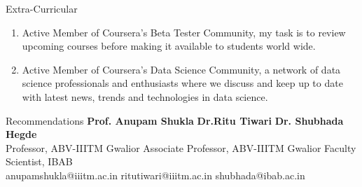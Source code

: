 \documentclass{resume} %
\begin{document}
\begin{rSection}{Extra-Curricular} \itemsep -3pt
\begin{enumerate}
\item Active Member of Coursera's Beta Tester Community, my task is to review upcoming courses before making it available to students world wide.
\item Active Member of Coursera's Data Science Community, a network of data science professionals and enthusiasts where we discuss and keep up to date with latest news, trends and technologies in data science.  
\end{enumerate}
\end{rSection}
\newpage
\begin{rSection}{Recommendations}
\textbf{Prof. Anupam Shukla} \hspace{1.3cm} \textbf{Dr.Ritu Tiwari} \hspace{4cm} \textbf{Dr. Shubhada Hegde}\\
Professor, ABV-IIITM Gwalior \hspace{0.3cm}Associate Professor, ABV-IIITM Gwalior \hspace{0.1cm} Faculty Scientist, IBAB\\
anupamshukla@iiitm.ac.in \hspace{1.1cm} ritutiwari@iiitm.ac.in \hspace{3.5cm} shubhada@ibab.ac.in
\end{rSection}
\end{document}
